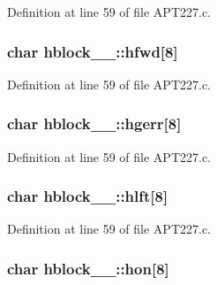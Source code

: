 Definition at line 59 of file A\+P\+T227.\+c.

\subsubsection[{\texorpdfstring{hfwd}{hfwd}}]{\setlength{\rightskip}{0pt plus 5cm}char hblock\+\_\+\_\+\+::hfwd\mbox{[}8\mbox{]}}\hypertarget{structhblock__1___aa7092417f940aeb740ad13c1c86a4372}{}\label{structhblock__1___aa7092417f940aeb740ad13c1c86a4372}


Definition at line 59 of file A\+P\+T227.\+c.

\subsubsection[{\texorpdfstring{hgerr}{hgerr}}]{\setlength{\rightskip}{0pt plus 5cm}char hblock\+\_\+\_\+\+::hgerr\mbox{[}8\mbox{]}}\hypertarget{structhblock__1___acd7958aeadc86997c52e870647416f86}{}\label{structhblock__1___acd7958aeadc86997c52e870647416f86}


Definition at line 59 of file A\+P\+T227.\+c.

\subsubsection[{\texorpdfstring{hlft}{hlft}}]{\setlength{\rightskip}{0pt plus 5cm}char hblock\+\_\+\_\+\+::hlft\mbox{[}8\mbox{]}}\hypertarget{structhblock__1___a3c9dee6e59b74aae4d1fdf3e7b83d37e}{}\label{structhblock__1___a3c9dee6e59b74aae4d1fdf3e7b83d37e}


Definition at line 59 of file A\+P\+T227.\+c.

\subsubsection[{\texorpdfstring{hon}{hon}}]{\setlength{\rightskip}{0pt plus 5cm}char hblock\+\_\+\_\+\+::hon\mbox{[}8\mbox{]}}\hypertarget{structhblock__1___a89696ad55a2da881a03804750e63ccd8}{}\label{structhblock__1___a89696ad55a2da881a03804750e63ccd8}


